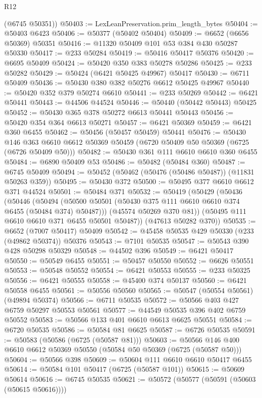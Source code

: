 \begin{lexlean}{R12}
\begin{coremodule}
      (@6745 @50351))
@50403 := LexLeanPreservation.prim_length_bytes
@50404 := @50403 @6423
@50406 := @50377 (@50402 @50404)
@50409 := @6652 (@6656 @50369) @50351
@50416 := @11320 @50409 @101 @53 @384 @430 @50287 @50330
@50417 := @233 @50284
@50419 := @50416 @50417 @50376
@50420 := @6695 @50409
@50424 := @50420 @350 @383 @50278 @50286
@50425 := @233 @50282
@50429 := @50424 (@6421 @50425 @49967) @50417
@50430 := @6711 @50409
@50436 := @50430 @380 @382 @50276 @6612 @50425 @49967
@50440 := @50420 @352 @379 @50274 @6610
@50441 := @233 @50269
@50442 := @6421 @50441
@50443 := @44506 @44524
@50446 := @50440 (@50442 @50443) @50425
@50452 := @50430 @365 @378 @50272 @6613 @50441 @50443
@50456 := @50420 @354 @364 @6613 @50271
@50457 := @6421 @50369
@50459 := @6421 @360 @6455
@50462 := @50456 (@50457 @50459) @50441
@50476 := @50430
    @146
    @363
    @6610
    @6612
    @50369
    @50459
    (@6720 @50409 @50 @50369 (@6725 (@6726 @50409 @50)))
@50482 := @50430 @361 @111 @6610 @6610 @360 @6455
@50484 := @6890 @50409 @53
@50486 := @50482 (@50484 @360)
@50487 := @6745 @50409
@50494 := @50452 (@50462 (@50476 (@50486 @50487)) (@11831 @50263 @359))
@50495 := @50430 @372
@50500 := @50495 @377 @6610 @6612 @371 @44524
@50501 := @50484 @371
@50532 := @50419
    (@50429
      (@50436
        (@50446
          (@50494 (@50500 @50501 (@50430 @375 @111 @6610 @6610 @374 @6455 (@50484 @374) @50487)))
          (@45574 @50269 @370 @81))
        (@50495 @111 @6610 @6610 @371 @6455 @50501 @50487))
      (@47613 @50282 @370))
@50535 := @6652 (@7007 @50417) @50409
@50542 := @45458 @50535 @429 @50330 (@233 (@49862 @50374)) @50376
@50543 := @7101 @50535
@50547 := @50543 @390 @428 @50298 @50329
@50548 := @44502 @396
@50549 := @6421 @50417
@50550 := @50549 @6455
@50551 := @50457 @50550
@50552 := @6626 @50551
@50553 := @50548 @50552
@50554 := @6421 @50553
@50555 := @233 @50325
@50556 := @6421 @50555
@50558 := @45400 @374 @50137
@50560 := @6421 @50558 @6455
@50561 := @50556 @50560
@50565 := @50547 (@50554 @50561) (@49894 @50374)
@50566 := @6711 @50535
@50572 := @50566 @403 @427 @6759 @50297 @50553 @50561
@50577 := @44549 @50535 @396 @402 @6759 @50552
@50583 := @50566 @133 @401 @6610 @6613 @6625 @50551
@50584 := @6720 @50535
@50586 := @50584 @81 @6625
@50587 := @6726 @50535
@50591 := @50583 (@50586 (@6725 (@50587 @81)))
@50603 := @50566 @146 @400 @6610 @6612 @50369 @50550 (@50584 @50 @50369 (@6725 (@50587 @50)))
@50604 := @50566 @398
@50609 := @50604 @111 @6610 @6610 @50417 @6455
@50614 := @50584 @101 @50417 (@6725 (@50587 @101))
@50615 := @50609 @50614
@50616 := @6745 @50535
@50621 := @50572 (@50577 (@50591 (@50603 (@50615 @50616))))

\end{coremodule}
\end{lexlean}
